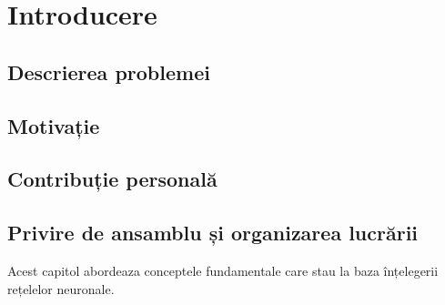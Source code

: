 \chapter{Introducere}

\section{Descrierea problemei}

\section{Motivație}

\section{Contribuție personală}

\section{Privire de ansamblu și organizarea lucrării}

Acest capitol abordeaza conceptele fundamentale care stau la baza înțelegerii rețelelor neuronale. 
